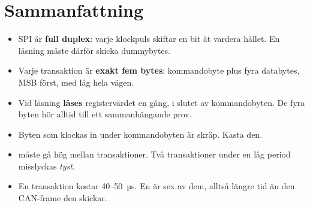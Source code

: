 \section*{Sammanfattning}

\begin{itemize}
  \item SPI är \textbf{full duplex}: varje klockpuls skiftar en bit åt vardera hållet. En läsning
    måste därför skicka dummybytes.
  \item Varje transaktion är \textbf{exakt fem bytes}: kommandobyte plus fyra databytes, MSB
    först, med  låg hela vägen.
  \item Vid läsning \textbf{låses} registervärdet en gång, i slutet av kommandobyten. De fyra
    byten hör alltid till ett sammanhängande prov.
  \item Byten som klockas in under kommandobyten är skräp. Kasta den.
  \item {} måste gå hög mellan transaktioner. Två transaktioner under en låg period
    misslyckas \emph{tyst}.
  \item En transaktion kostar 40--50~µs. En  är sex av dem, alltså längre tid än den
    CAN-frame den skickar.
\end{itemize}
